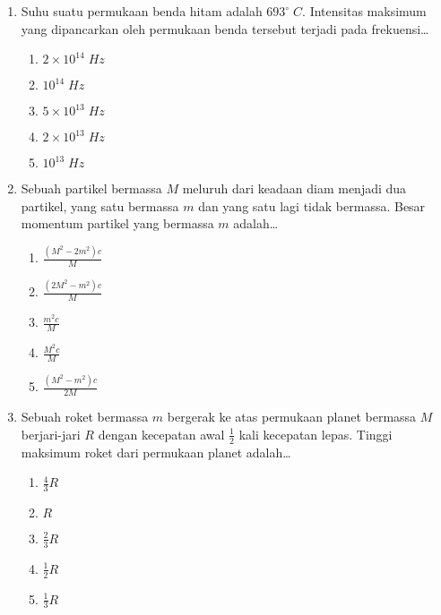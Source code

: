 \documentclass[A4,12PT, english, twocolumn]{journal}
\begin{document}
\begin{enumerate}
\item Suhu suatu permukaan benda hitam adalah $693^\circ \; C$. Intensitas maksimum yang dipancarkan oleh permukaan benda tersebut terjadi pada frekuensi\dots
    \begin{enumerate}
        \item $2 \times 10^14 \; Hz$
        \item $10^14 \; Hz$
        \item $5 \times 10^13 \; Hz$
        \item $2 \times 10^13 \; Hz$
        \item $10^13 \; Hz$
    \end{enumerate}

\item Sebuah partikel bermassa $M$ meluruh dari keadaan diam menjadi dua partikel, yang satu bermassa $m$ dan yang satu lagi tidak bermassa. Besar momentum partikel yang bermassa $m$ adalah\dots
    \begin{enumerate}
        \item $\frac{\left( M^2-2m^2 \right)c}{M}$
        \item $\frac{\left( 2M^2-m^2 \right)c}{M}$
        \item $\frac{m^2c}{M}$
        \item $\frac{M^2c}{M}$
        \item $\frac{\left( M^2-m^2 \right)c}{2M}$
    \end{enumerate}

\item Sebuah roket bermassa $m$ bergerak ke atas permukaan planet bermassa $M$ berjari-jari $R$ dengan kecepatan awal $\frac{1}{2}$ kali kecepatan lepas. Tinggi maksimum roket dari permukaan planet adalah\dots
    \begin{enumerate}
        \item $\frac{4}{3}R$
        \item $R$
        \item $\frac{2}{3}R$
        \item $\frac{1}{2}R$
        \item $\frac{1}{3}R$
    \end{enumerate}

\end{enumerate}
\end{document}
